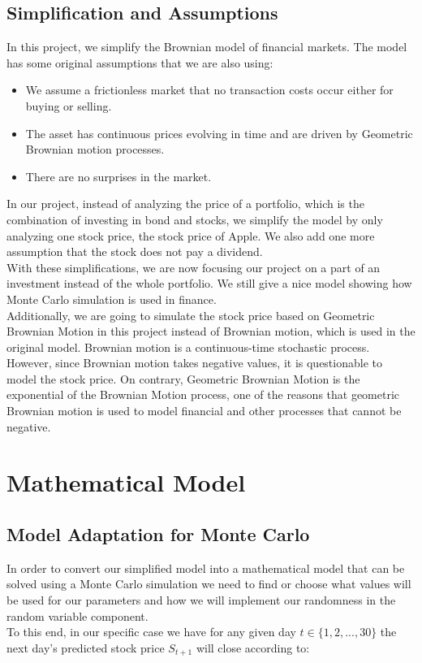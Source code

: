 \documentclass{article}
\begin{document}
\subsection{Simplification and Assumptions}
In this project, we simplify the Brownian model of financial markets. The model has some original assumptions that we are also using: \cite{WikiBModel}
\begin{itemize}
	\item We assume a frictionless market that no transaction costs occur either for buying or selling.
    \item The asset has continuous prices evolving in time and are driven by Geometric Brownian motion processes.
    \item There are no surprises in the market. 
\end{itemize}
In our project, instead of analyzing the price of a portfolio, which is the combination of investing in bond and stocks, we simplify the model by only analyzing one stock price, the stock price of Apple. We also add one more assumption that the stock does not pay a dividend.\\
With these simplifications, we are now focusing our project on a part of an investment instead of the whole portfolio. We still give a nice model showing how Monte Carlo simulation is used in finance. \\
Additionally, we are going to simulate the stock price based on Geometric Brownian Motion in this project instead of Brownian motion, which is used in the original model. Brownian motion is a continuous-time stochastic process. However, since Brownian motion takes negative values, it is questionable to model the stock price. On contrary, Geometric Brownian Motion is the exponential of the Brownian Motion process, one of the reasons that geometric Brownian motion is used to model financial and other processes that cannot be negative.\cite{GBMoverBM} \\

\section{Mathematical Model}

\subsection{Model Adaptation for Monte Carlo}
In order to convert our simplified model into a mathematical model that can be solved using a Monte Carlo simulation we need to find or choose what values will be used for our parameters and how we will implement our randomness in the random variable component.\\
To this end, in our specific case we have for any given day $t \in \{1,2,...,30\}$ the next day's predicted stock price $S_{t+1}$ will close according to:
\end{document}
